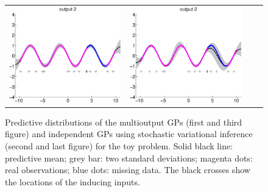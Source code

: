 \begin{figure}
\begin{tabular}{cccc}
\includegraphics[scale=0.2]{figures/toy-slfm-y2.eps} &
\includegraphics[scale=0.2]{figures/toy-svigp-y2.eps}
\label{fig:toy}
\end{tabular}
\caption{Predictive distributions of the multioutput GPs (first and third figure) and independent GPs using stochastic variational inference (second and last figure) for the  toy problem. Solid black line: predictive mean; grey bar: two standard deviations; magenta dots: real observations; blue dots: missing data. The black crosses show the locations of the inducing inputs.}
\label{fig:toy}
\end{figure}


